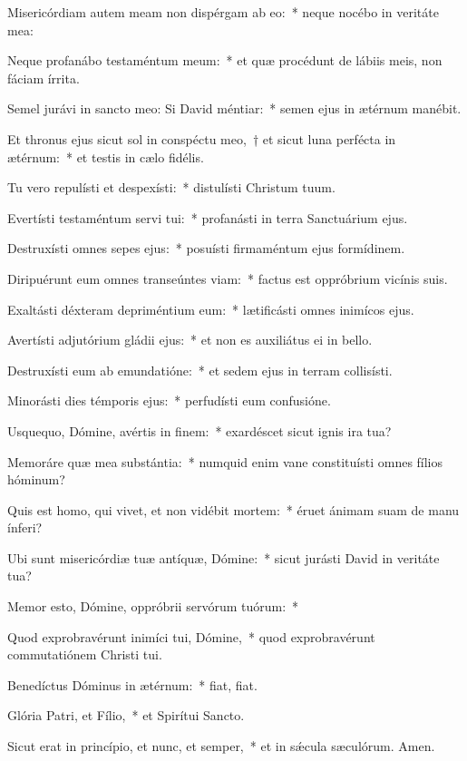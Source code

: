 \item Misericórdiam autem meam non dispérgam ab eo:~* neque nocébo in veritáte mea:

\item Neque profanábo testaméntum meum:~* et quæ procédunt de lábiis meis, non fáciam írrita.

\item Semel jurávi in sancto meo: Si David méntiar:~* semen ejus in ætérnum manébit.

\item Et thronus ejus sicut sol in conspéctu meo,~† et sicut luna perfécta in ætérnum:~* et testis in cælo fidélis.

\item Tu vero repulísti et despexísti:~* distulísti Christum tuum.

\item Evertísti testaméntum servi tui:~* profanásti in terra Sanctuárium ejus.

\item Destruxísti omnes sepes ejus:~* posuísti firmaméntum ejus formídinem.

\item Diripuérunt eum omnes transeúntes viam:~* factus est oppróbrium vicínis suis.

\item Exaltásti déxteram depriméntium eum:~* lætificásti omnes inimícos ejus.

\item Avertísti adjutórium gládii ejus:~* et non es auxiliátus ei in bello.

\item Destruxísti eum ab emundatióne:~* et sedem ejus in terram collisísti.

\item Minorásti dies témporis ejus:~* perfudísti eum confusióne.

\item Usquequo, Dómine, avértis in finem:~* exardéscet sicut ignis ira tua?

\item Memoráre quæ mea substántia:~* numquid enim vane constituísti omnes fílios hóminum?

\item Quis est homo, qui vivet, et non vidébit mortem:~* éruet ánimam suam de manu ínferi?

\item Ubi sunt misericórdiæ tuæ antíquæ, Dómine:~* sicut jurásti David in veritáte tua?

\item Memor esto, Dómine, oppróbrii servórum tuórum:~*

\item Quod exprobravérunt inimíci tui, Dómine,~* quod exprobravérunt commutatiónem Christi tui.

\item Benedíctus Dóminus in ætérnum:~* fiat, fiat.

\item Glória Patri, et Fílio,~* et Spirítui Sancto.

\item Sicut erat in princípio, et nunc, et semper,~* et in sǽcula sæculórum. Amen.

